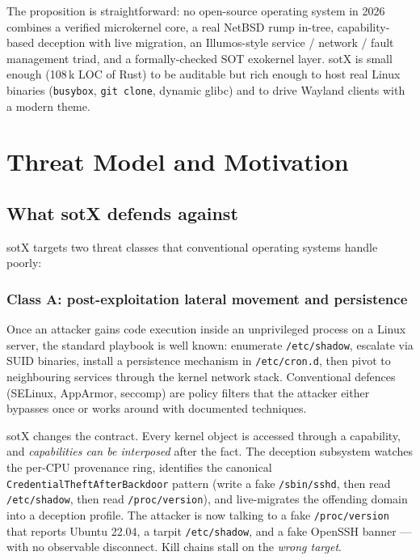 \documentclass[11pt,a4paper]{article}
\begin{document}
The proposition is straightforward: no open-source operating system
in 2026 combines a verified microkernel core, a real NetBSD rump
in-tree, capability-based deception with live migration, an Illumos-style
service / network / fault management triad, and a formally-checked SOT
exokernel layer. sotX is small enough (108\,k LOC of Rust) to be
auditable but rich enough to host real Linux binaries
(\texttt{busybox}, \texttt{git clone}, dynamic glibc) and to drive
Wayland clients with a modern theme.

\section{Threat Model and Motivation}

\subsection{What sotX defends against}

sotX targets two threat classes that conventional operating systems
handle poorly:

\subsubsection*{Class A: post-exploitation lateral movement and
persistence}

Once an attacker gains code execution inside an unprivileged process
on a Linux server, the standard playbook is well known: enumerate
\texttt{/etc/shadow}, escalate via SUID binaries, install a persistence
mechanism in \texttt{/etc/cron.d}, then pivot to neighbouring services
through the kernel network stack. Conventional defences (SELinux,
AppArmor, seccomp) are policy filters that the attacker either bypasses
once or works around with documented techniques.

sotX changes the contract. Every kernel object is accessed through a
capability, and \emph{capabilities can be interposed} after the fact.
The deception subsystem watches the per-CPU provenance ring, identifies
the canonical \texttt{CredentialTheftAfterBackdoor} pattern (write a
fake \texttt{/sbin/sshd}, then read \texttt{/etc/shadow}, then read
\texttt{/proc/version}), and live-migrates the offending domain into
a deception profile. The attacker is now talking to a fake
\texttt{/proc/version} that reports Ubuntu 22.04, a tarpit
\texttt{/etc/shadow}, and a fake OpenSSH banner --- with no observable
disconnect. Kill chains stall on the \emph{wrong target}.
\end{document}
